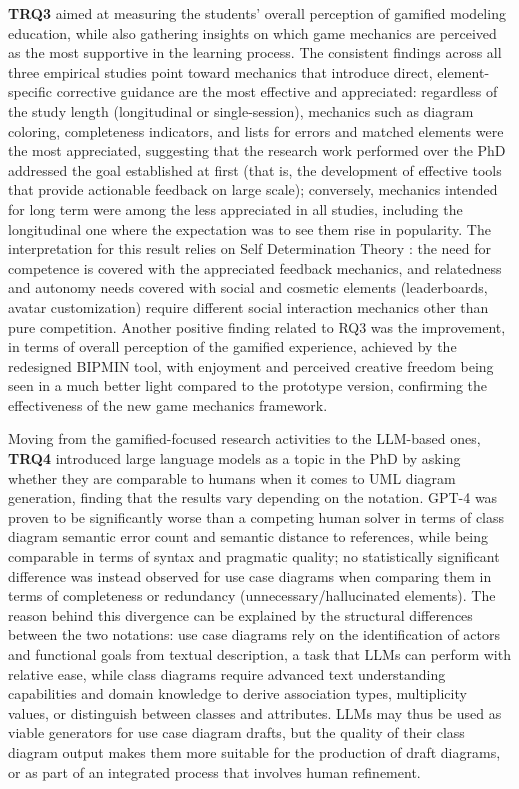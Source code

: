 \textbf{TRQ3} aimed at measuring the students' overall perception of gamified modeling education, while also gathering insights on which game mechanics are perceived as the most supportive in the learning process. The consistent findings across all three empirical studies point toward mechanics that introduce direct, element-specific corrective guidance are the most effective and appreciated: regardless of the study length (longitudinal or single-session), mechanics such as diagram coloring, completeness indicators, and lists for errors and matched elements were the most appreciated, suggesting that the research work performed over the PhD addressed the goal established at first (that is, the development of effective tools that provide actionable feedback on large scale); conversely, mechanics intended for long term were among the less appreciated in all studies, including the longitudinal one where the expectation was to see them rise in popularity. The interpretation for this result relies on Self Determination Theory \cite{deci1985intrinsic, deci2000intrinsic}: the need for competence is covered with the appreciated feedback mechanics, and relatedness and autonomy needs covered with social and cosmetic elements (leaderboards, avatar customization) require different social interaction mechanics other than pure competition. Another positive finding related to RQ3 was the improvement, in terms of overall perception of the gamified experience, achieved by the redesigned BIPMIN tool, with enjoyment and perceived creative freedom being seen in a much better light compared to the prototype version, confirming the effectiveness of the new game mechanics framework.

Moving from the gamified-focused research activities to the LLM-based ones, \textbf{TRQ4} introduced large language models as a topic in the PhD by asking whether they are comparable to humans when it comes to UML diagram generation, finding that the results vary depending on the notation. GPT-4 was proven to be significantly worse than a competing human solver in terms of class diagram semantic error count and semantic distance to references, while being comparable in terms of syntax and pragmatic quality; no statistically significant difference was instead observed for use case diagrams when comparing them in terms of completeness or redundancy (unnecessary/hallucinated elements). The reason behind this divergence can be explained by the structural differences between the two notations: use case diagrams rely on the identification of actors and functional goals from textual description, a task that LLMs can perform with relative ease, while class diagrams require advanced text understanding capabilities and domain knowledge to derive association types, multiplicity values, or distinguish between classes and attributes. LLMs may thus be used as viable generators for use case diagram drafts, but the quality of their class diagram output makes them more suitable for the production of draft diagrams, or as part of an integrated process that involves human refinement.

